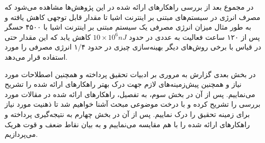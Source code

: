 \par
در مجموع بعد از بررسی راهکارهای ارائه شده در این پژوهش‌ها مشاهده می‌شود که مصرف انرژی در سیستم‌های مبتنی بر اینترنت اشیا تا مقدار قابل توجهی کاهش یافته و به طور مثال میزان انرژی مصرفی یک سیستم مبتنی بر اینترنت اشیا با ۴۵۰۰ حسگر پس از ۱۲۰ ساعت فعالیت به عددی در حدود $10 \times 10^6 nJ$ کاهش یابد که این مقدار حتی در قیاس با برخی روش‌های دیگر بهینه‌سازی چیزی در حدود ۱/۴ انرژی مصرفی را مورد استفاده قرار می‌دهد.

\par
در بخش بعدی گزارش به مروری بر ادبیات تحقیق پرداخته و همچنین اصطلاحات مورد نیاز و همچنین پیش‌زمینه‌های لازم جهت درک بهتر راهکارهای ارائه شده را تشریح می‌نماییم. پس از آن در بخش سوم، به تفصیل، راهکارهای ارائه شده در مقالات مورد بررسی را تشریح کرده و با درخت موضوعی مبحث آشنا خواهیم شد تا ذهنیت مورد نیاز برای زمینه تحقیق را درک نماییم. پس از آن در بخش چهارم به نتیجه‌گیری پرداخته و راهکارهای ارائه شده را با هم مقایسه می‌نماییم و به بیان نقاط ضعف و قوت هریک می‌پردازیم.












